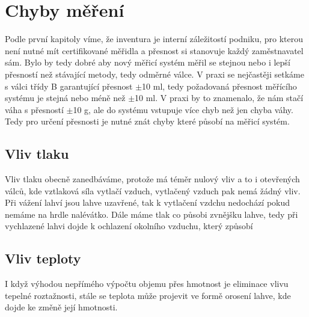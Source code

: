 

\section{Chyby měření}
\label{sec:chyby měření}
Podle první kapitoly víme, že inventura je interní záležitostí podniku, pro kterou není nutné mít certifikované měřidla a přesnost si stanovuje každý zaměstnavatel sám. Bylo by tedy dobré aby nový měřicí systém měřil se stejnou nebo i lepší přesností než stávající metody, tedy odměrné válce. V praxi se nejčastěji setkáme s válci třídy B garantující přesnost $\pm$10 ml, tedy požadovaná přesnost měřícího systému je stejná nebo méně než $\pm$10 ml. V praxi by to znamenalo, že nám stačí váha s přesností $\pm$10 g, ale do systému vstupuje více chyb než jen chyba váhy.
Tedy pro určení přesnosti je nutné znát chyby které působí na měřicí systém.
\subsection{Vliv tlaku}
Vliv tlaku obecně zanedbáváme, protože má téměr nulový vliv a to i otevřených válců, kde vztlaková síla vytlačí vzduch, vytlačený vzduch pak nemá žádný vliv. Při vážení lahví jsou lahve uzavřené, tak k vytlačení vzdchu nedochází pokud nemáme na hrdle nalévátko. Dále máme tlak co působi zvnějšku lahve, tedy při vychlazené lahvi dojde k ochlazení okolního vzduchu, který způsobí 

\subsection{Vliv teploty}
\label{orosení}
I když výhodou nepřímého výpočtu objemu přes hmotnost je eliminace vlivu tepelné roztažnosti, stále se teplota může projevit ve formě orosení lahve, kde dojde ke změně její hmotnosti.

